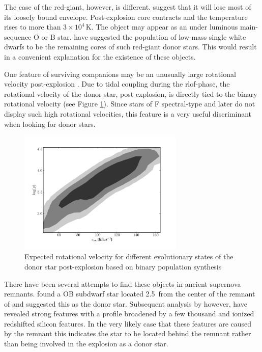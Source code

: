 The case of the red-giant, however, is different. \citet{2000ApJS..128..615M} suggest that it will lose most of its loosely bound envelope. Post-explosion core contracts and the temperature rises to more than $3 \times 10^4$\,K. The object may appear as an under luminous main-sequence O or B star. \cite{2009A&A...493.1081J} have suggested the population of low-mass single white dwarfs to be the remaining cores of such red-giant donor stars. This would result in a convenient explanation for the existence of these objects. 

One feature of surviving companions may be an unusually large rotational velocity post-explosion \citep[][Chapter \ref{chap:sn1572_starg} of this work]{2009ApJ...701.1665K}. Due to tidal coupling during the \gls{rlof}-phase, the rotational velocity  of the donor star, post explosion, is directly tied to the binary rotational velocity (see Figure \ref{fig:han2008_vrot}). Since stars of F spectral-type and later do not display such high rotational velocities, this feature is a very useful discriminant when looking for donor stars. 

\begin{figure}[htbp] %
   \centering
   \includegraphics[width=0.7\textwidth]{chapter_intro/plots/theo_vrot.pdf} 
   \caption{Expected rotational velocity for different evolutionary states of the donor star post-explosion based on binary population synthesis \citep[][data kindly provided by Z. Han]{2008ApJ...677L.109H} }
   \label{fig:han2008_vrot}
\end{figure}


There have been several attempts to find these objects in ancient supernova remnants. \citet{1980ApJ...241.1039S} found a OB subdwarf star located 2.5\arcmin\ from the center of the remnant of  and suggested this as the donor star. Subsequent analysis by \cite{1997ApJ...477L..53W, 1983ApJ...269L...5W} however, have revealed strong  features with a profile broadened by a few thousand \kms and ionized redshifted silicon features. In the very likely case that these features are caused by the remnant this indicates the star to be located behind the remnant rather than being involved in the \snia explosion as a donor star.
 
